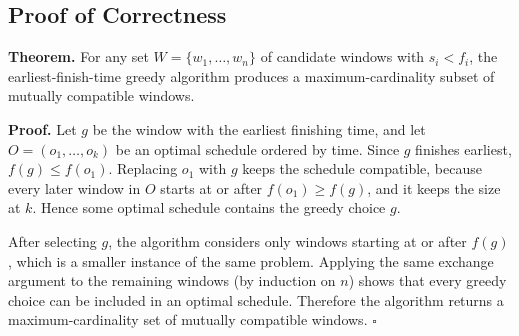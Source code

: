 \subsection{Proof of Correctness}
\label{sec:greedy-proof}

\noindent\textbf{Theorem.} For any set
$W = \{w_1, \ldots, w_n\}$ of candidate windows with
$s_i < f_i$, the earliest-finish-time greedy algorithm
produces a maximum-cardinality subset of mutually
compatible windows.

\medskip
\noindent\textbf{Proof.}
Let $g$ be the window with the earliest finishing time,
and let $O = (o_1, \ldots, o_k)$ be an optimal schedule
ordered by time. Since $g$ finishes earliest,
$f(g) \leq f(o_1)$. Replacing $o_1$ with $g$ keeps the
schedule compatible, because every later window in $O$
starts at or after $f(o_1) \geq f(g)$, and it keeps the
size at $k$. Hence some optimal schedule contains the
greedy choice $g$.

After selecting $g$, the algorithm considers only
windows starting at or after $f(g)$, which is a smaller
instance of the same problem. Applying the same
exchange argument to the remaining windows (by
induction on $n$) shows that every greedy choice can
be included in an optimal schedule. Therefore the
algorithm returns a maximum-cardinality set of
mutually compatible windows. \hfill $\square$
